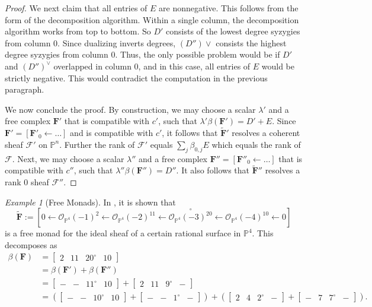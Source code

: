 \documentclass[12pt]{amsart}
\theoremstyle{definition}
\theoremstyle{remark}
\newtheorem{example}[lemma]{Example}
\newcommand{\PP}{\mathbb{P}}
\newcommand{\cc}{c}
\newcommand{\cO}{\mathcal{O}}
\newcommand{\cF}{\mathcal{F}}
\newcommand{\FF}{\mathbf{F}}
\newcommand{\zp}{\circ}
\begin{document}
\begin{proof}
We next claim that all entries of $E$ are nonnegative.  This follows from the form of the decomposition algorithm.  Within a single column, the decomposition algorithm works from top to bottom.  So $D'$ consists of the lowest degree syzygies from column $0$.  Since dualizing inverts degrees, $(D'')\vee$ consists the highest degree syzygies from column $0$.  Thus, the only possible problem would be if $D'$ and $(D'')^\vee$ overlapped in column $0$, and in this case, all entries of $E$ would be strictly negative.  This would contradict the computation in the previous paragraph.

We now conclude the proof.  By construction, we may choose a scalar $\lambda'$ and a free complex $\FF'$ that is compatible with $\cc'$, such that $\lambda'\beta(\FF')=D'+E$.  Since $\FF'=[\FF'_0\gets \dots]$ and is compatible with $\cc'$, it follows that $\widetilde{\FF}'$ resolves a coherent sheaf $\cF'$ on $\PP^n$.  Further the rank of $\cF'$ equals $\sum_{j} \beta_{0,j} E$ which equals the rank of $\cF$.  Next, we may choose a scalar $\lambda''$ and a free complex $\FF''=[\FF''_0\gets \dots]$ that is compatible with $\cc''$, such that $\lambda''\beta(\FF'')=D''$.  It also follows that $\widetilde{\FF}''$ resolves a rank $0$ sheaf $\cF''$.
\end{proof}

\begin{example}[Free Monads]\label{ex:monads}
In \cite[Example 8.2]{eis-floy-schrey}, it is shown that
\[
\widetilde{\FF}:=\left[0\gets \cO_{\PP^4}(-1)^2 \gets  \cO_{\PP^4}(-2)^{11}\gets \overset{\zp}{\cO_{\PP^4}(-3)^{20}}\gets \cO_{\PP^4}(-4)^{10}\gets 0 \right]
\]
is a free monad for the ideal sheaf of a certain rational surface in $\PP^4$.  This decomposes as
\begin{align*}
\beta(\FF)&=
\begin{bmatrix}
2&11&20^\zp&10
\end{bmatrix}
\\
&=\beta(\FF')+\beta(\FF'')
\\
&=
\begin{bmatrix}
-&-&11^\zp&10
\end{bmatrix}
+
\begin{bmatrix}
2&11&9^\zp&-
\end{bmatrix}
\\
&=
\left(
\begin{bmatrix}
-&-&10^\zp&10
\end{bmatrix}
+
\begin{bmatrix}
-&-&1^\zp&-
\end{bmatrix}
\right)
+
\left( \begin{bmatrix}
2&4&2^\zp&-
\end{bmatrix}
+
\begin{bmatrix}
-&7&7^\zp&-
\end{bmatrix}
\right).
\end{align*}
\end{example}
\end{document}
